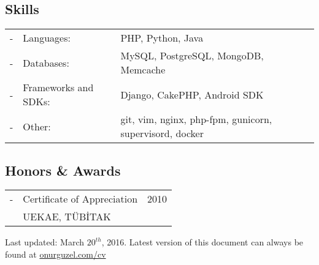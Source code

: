 \documentclass[11pt,a4paper]{article}
\begin{document}
\subsection*{Skills}
\begin{tabularx}{\textwidth}{l l X}
- & Languages: & PHP, Python, Java\\
- & Databases: & MySQL, PostgreSQL, MongoDB, Memcache\\
- & Frameworks and SDKs: & Django, CakePHP, Android SDK\\
- & Other: & git, vim, nginx, php-fpm, gunicorn, supervisord, docker
\end{tabularx}

\subsection*{Honors \& Awards}
\begin{tabularx}{\textwidth}{l X r}
- & Certificate of Appreciation & 2010\\
& UEKAE, TÜBİTAK
\end{tabularx}

\vspace{10pt}
\footnotesize {\color[gray]{0.25} Last updated: March $20^{th}$, 2016. Latest version of this document can always be found at \href{http://onurguzel.com/cv}{\color{black}onurguzel.com/cv}}
\end{document}
